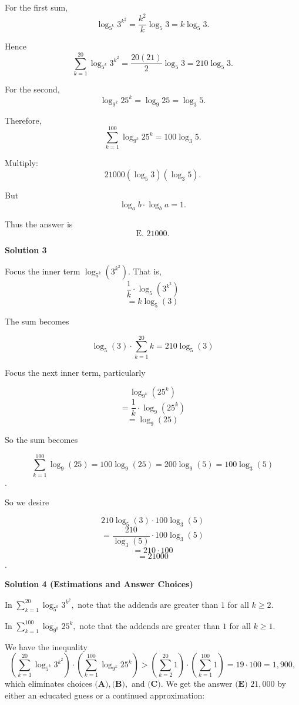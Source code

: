 \begin{enumerate}
 For the first sum,\[\log_{5^k}3^{k^2}=\frac{k^2}{k}\log_5 3=k\log_5 3.\]

 Hence\[\sum_{k=1}^{20}\log_{5^k}3^{k^2}=\frac{20(21)}2\log_5 3=210\log_5 3.\]

 For the second,\[\log_{9^k}25^k=\log_9 25=\log_3 5.\]

 Therefore,\[\sum_{k=1}^{100}\log_{9^k}25^k=100\log_3 5.\]

 Multiply:
 \[21000(\log_5 3)(\log_3 5).\]

 But
 \[\boxed{\log_a b\cdot\log_b a=1}.\]

 Thus the answer is
 \[\boxed{\text{E. }21000}.\]




\textbf{Solution 3}

Focus the inner term $\log_{5^k}(3^{k^{2}})$. That is,
 \[\frac{1}{k} \cdot \log_{5}(3^{k^{2}})\]
 \[= k \log_{5}(3)\]

 The sum becomes

 
 \[\log_{5}(3) \cdot \sum_{k=1}^{20} k = 210 \log_{5}(3)\]

 Focus the next inner term, particularly

 
 \[\log_{9^k}(25^k)\]
 \[= \frac{1}{k} \cdot \log_9(25^k)\]
 \[= \log_9(25)\]

 So the sum becomes

 
 \[\sum_{k=1}^{100} \log_9(25) = 100\log_9(25) = 200\log_9(5) = 100\log_3(5)\].

 So we desire

 
 \[210 \log_{5}(3) \cdot 100\log_3(5)\]
 \[= \frac{210}{\log_3(5)} \cdot 100 \log_3(5)\]
 \[= 210 \cdot 100\]
 \[= \boxed{21000}\].

 


 



\textbf{Solution 4 (Estimations and Answer Choices)}

In $\sum_{k=1}^{20} \log_{5^k} 3^{k^2},$ note that the addends are greater than $1$ for all $k\geq2.$

 In $\sum_{k=1}^{100} \log_{9^k} 25^k,$ note that the addends are greater than $1$ for all $k\geq1.$

 We have the inequality 
 \[\left(\sum_{k=1}^{20} \log_{5^k} 3^{k^2}\right)\cdot\left(\sum_{k=1}^{100} \log_{9^k} 25^k\right)>\left(\sum_{k=2}^{20} 1\right)\cdot\left(\sum_{k=1}^{100} 1\right)=19\cdot100=1{,}900,\] which eliminates choices $\textbf{(A)}, \textbf{(B)},$ and $\textbf{(C)}.$ We get the answer $\boxed{\textbf{(E) }21{,}000}$ by either an educated guess or a continued approximation: 


\end{enumerate}
